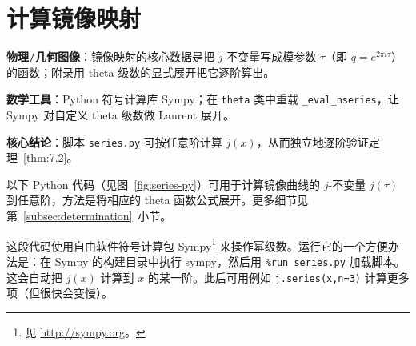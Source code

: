 
\section{计算镜像映射}
\label{app:mirror-map}

\begin{keytakeaways}
  \item \textbf{物理/几何图像}：镜像映射的核心数据是把 $j$-不变量写成模参数 $\tau$（即 $q=e^{2\pi i\tau}$）的函数；附录用 theta 级数的显式展开把它逐阶算出。
  \item \textbf{数学工具}：Python 符号计算库 Sympy；在 \texttt{theta} 类中重载 \texttt{\_eval\_nseries}，让 Sympy 对自定义 theta 级数做 Laurent 展开。
  \item \textbf{核心结论}：脚本 \texttt{series.py} 可按任意阶计算 $j(x)$，从而独立地逐阶验证定理~\ref{thm:7.2}。
\end{keytakeaways}

以下 Python 代码（见图~\ref{fig:series-py}）可用于计算镜像曲线的 $j$-不变量 $j(\tau)$ 到任意阶，方法是将相应的 theta 函数公式展开。更多细节见第~\ref{subsec:determination}~小节。

这段代码使用自由软件符号计算包 Sympy\footnote{见 \url{http://sympy.org}。} 来操作幂级数。运行它的一个方便办法是：在 Sympy 的构建目录中执行 sympy，然后用 \texttt{\%run series.py} 加载脚本。这会自动把 $j(x)$ 计算到 $x$ 的某一阶。此后可用例如 \texttt{j.series(x,n=3)} 计算更多项（但很快会变慢）。



